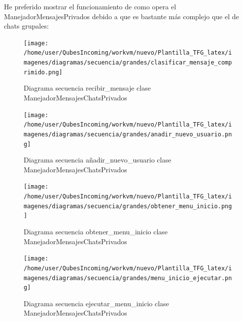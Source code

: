 He preferido mostrar el funcionamiento de como opera el ManejadorMensajesPrivados debido a que es bastante más complejo que el de chats grupales:


\begin{figure}[H] %
\centering
\texttt{[image: /home/user/QubesIncoming/workvm/nuevo/Plantilla\_TFG\_latex/imagenes/diagramas/secuencia/grandes/clasificar\_mensaje\_comprimido.png]}  %

\caption{Diagrama secuencia recibir\_mensaje clase  ManejadorMensajesChatsPrivados}\label{figura221}
\end{figure}




\begin{figure}[H] %
\centering
\texttt{[image: /home/user/QubesIncoming/workvm/nuevo/Plantilla\_TFG\_latex/imagenes/diagramas/secuencia/grandes/anadir\_nuevo\_usuario.png]}  %

\caption{Diagrama secuencia añadir\_nuevo\_usuario clase  ManejadorMensajesChatsPrivados}\label{figura222}
\end{figure}


\begin{figure}[H] %
\centering
\texttt{[image: /home/user/QubesIncoming/workvm/nuevo/Plantilla\_TFG\_latex/imagenes/diagramas/secuencia/grandes/obtener\_menu\_inicio.png]}  %

\caption{Diagrama secuencia obtener\_menu\_inicio clase  ManejadorMensajesChatsPrivados}\label{figura223}
\end{figure}

\begin{figure}[H] %
\centering
\texttt{[image: /home/user/QubesIncoming/workvm/nuevo/Plantilla\_TFG\_latex/imagenes/diagramas/secuencia/grandes/menu\_inicio\_ejecutar.png]}  %

\caption{Diagrama secuencia ejecutar\_menu\_inicio clase  ManejadorMensajesChatsPrivados}\label{figura227}
\end{figure}

